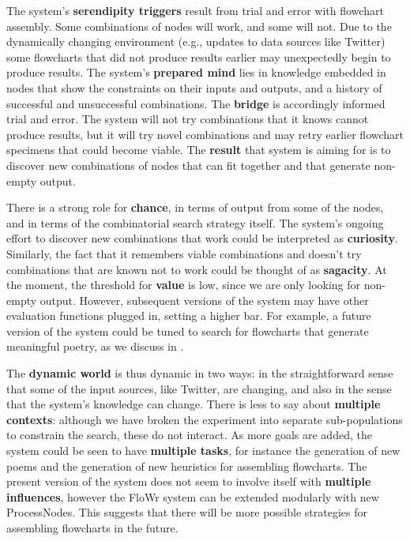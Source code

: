 The system's \textbf{serendipity triggers} result from trial and error
with flowchart assembly.  Some combinations of nodes will work, and
some will not.  Due to the dynamically changing environment
(e.g., updates to data sources like Twitter) some flowcharts that did
not produce results earlier may unexpectedly begin to produce results.
%
The system's \textbf{prepared mind} lies in knowledge embedded in
nodes that show the constraints on their inputs and outputs, and a
history of successful and unsuccessful combinations.
%
The \textbf{bridge} is accordingly informed trial and error.  The
system will not try combinations that it knows cannot produce results,
but it will try novel combinations and may retry earlier flowchart
specimens that could become viable.
%
The \textbf{result} that system is aiming for is to discover new
combinations of nodes that can fit together and that generate
non-empty output.

There is a strong role for \textbf{chance}, in terms of output from
some of the nodes, and in terms of the combinatorial search strategy
itself.  The system's ongoing effort to discover new combinations that
work could be interpreted as \textbf{curiosity}.  Similarly, the fact
that it remembers viable combinations and doesn't try combinations
that are known not to work could be thought of as \textbf{sagacity}.
At the moment, the threshold for \textbf{value} is low, since we are
only looking for non-empty output.  However, subsequent versions of
the system may have other evaluation functions plugged in, setting a
higher bar.  For example, a future version of the system could be
tuned to search for flowcharts that generate meaningful poetry, as we
discuss in \cite{corneli2015computational}.

The \textbf{dynamic world} is thus dynamic in two ways: in the
straightforward sense that some of the input sources, like Twitter,
are changing, and also in the sense that the system's knowledge can
change.  There is less to say about \textbf{multiple contexts}:
although we have broken the experiment into separate sub-populations
to constrain the search, these do not interact.  As more goals are
added, the system could be seen to have \textbf{multiple tasks}, for
instance the generation of new poems and the generation of new
heuristics for assembling flowcharts.  The present version of the
system does not seem to involve itself with \textbf{multiple
  influences}, however the FloWr system can be extended modularly with
new ProcessNodes.  This suggests that there will be more possible
strategies for assembling flowcharts in the future.

